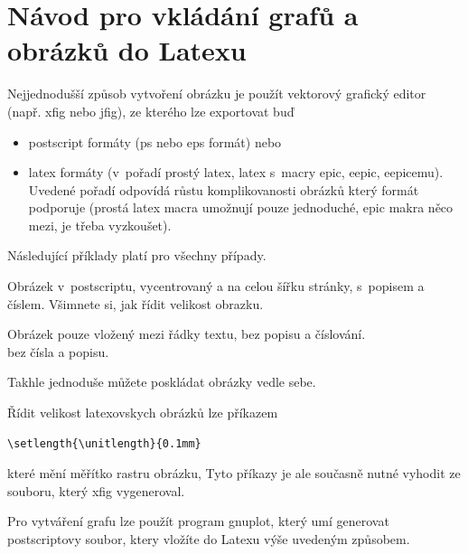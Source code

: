 \documentclass[12pt]{article}
\begin{document}
\section{Návod pro vkládání grafů a obrázků do Latexu}

Nejjednodušší způsob vytvoření obrázku je použít vektorový grafický
editor (např. xfig nebo jfig), ze kterého lze exportovat buď
\begin{itemize}
\item postscript formáty (ps nebo eps formát) nebo
\item latex formáty (v~pořadí prostý latex, latex s~macry epic, eepic, eepicemu). Uvedené pořadí odpovídá růstu
komplikovanosti obrázků který formát podporuje (prostá latex macra
umožnují pouze jednoduché, epic makra něco mezi, je třeba
vyzkoušet).

\end{itemize}
Následující příklady platí pro všechny případy.

Obrázek v~postscriptu, vycentrovaný a na celou šířku stránky,
s~popisem a číslem. Všimnete si, jak řídit velikost obrazku.

Obrázek pouze vložený mezi řádky textu, bez popisu a číslování.\\


bez čísla a popisu.

Takhle jednoduše můžete poskládat obrázky vedle sebe.

Řídit velikost latexovskych obrázků lze příkazem
\begin{verbatim}
\setlength{\unitlength}{0.1mm}
\end{verbatim}
které mění měřítko rastru obrázku, Tyto příkazy je ale současně
nutné vyhodit ze souboru, který xfig vygeneroval.

Pro vytváření grafu lze použít program gnuplot, který umí generovat
postscriptovy soubor, ktery vložíte do Latexu výše uvedeným
způsobem.
\end{document}
